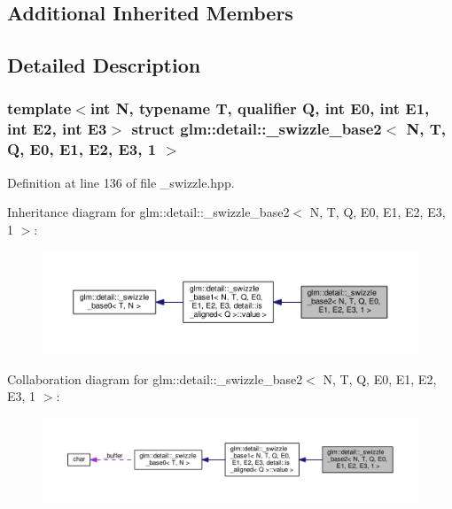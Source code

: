 \subsection*{Additional Inherited Members}


\subsection{Detailed Description}
\subsubsection*{template$<$int N, typename T, qualifier Q, int E0, int E1, int E2, int E3$>$\newline
struct glm\+::detail\+::\+\_\+swizzle\+\_\+base2$<$ N, T, Q, E0, E1, E2, E3, 1 $>$}



Definition at line 136 of file \+\_\+swizzle.\+hpp.



Inheritance diagram for glm\+:\+:detail\+:\+:\+\_\+swizzle\+\_\+base2$<$ N, T, Q, E0, E1, E2, E3, 1 $>$\+:
\nopagebreak
\begin{figure}[H]
\begin{center}
\leavevmode
\includegraphics[width=350pt]{d3/d97/structglm_1_1detail_1_1__swizzle__base2_3_01N_00_01T_00_01Q_00_01E0_00_01E1_00_01E2_00_01E3_00_011_01_4__inherit__graph}
\end{center}
\end{figure}


Collaboration diagram for glm\+:\+:detail\+:\+:\+\_\+swizzle\+\_\+base2$<$ N, T, Q, E0, E1, E2, E3, 1 $>$\+:
\nopagebreak
\begin{figure}[H]
\begin{center}
\leavevmode
\includegraphics[width=350pt]{d8/d77/structglm_1_1detail_1_1__swizzle__base2_3_01N_00_01T_00_01Q_00_01E0_00_01E1_00_01E2_00_01E3_00_011_01_4__coll__graph}
\end{center}
\end{figure}


